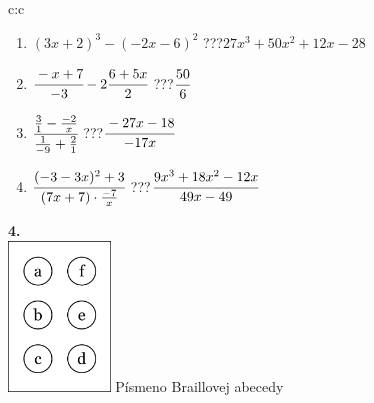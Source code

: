 \documentclass[10pt]{report}
\begin{document}
\begin{tabular}{c:c}
\begin{minipage}[c][104.5mm][t]{0.5\linewidth}
\begin{center}
\begin{minipage}{0.79\linewidth}
\begin{center}
\begin{varwidth}{\linewidth}
\begin{enumerate}
\item $(3x+2)^3-(-2x-6)^2$\quad \dotfill\; ???\;\dotfill \quad $27x^3+50x^2+12x-28$
\item $\cfrac{-x+7}{-3}-2\cfrac{6+5x}{2}$\quad \dotfill\; ???\;\dotfill \quad $\cfrac{50}{6}$
\item $\cfrac{\frac{3}{1}-\frac{-2}{x}}{\frac{1}{-9}+\frac{2}{1}}$\quad \dotfill\; ???\;\dotfill \quad $\cfrac{-27x-18}{-17x}$
\item $\cfrac{(-3-3x)^2+3}{(7x+7)\cdot\frac{-7}{x}}$\quad \dotfill\; ???\;\dotfill \quad $\cfrac{9x^3+18x^2-12x}{49x-49}$
\end{enumerate}
\end{varwidth}
\end{center}
\end{minipage}
\begin{minipage}{0.20\linewidth}
\begin{center}
{\Huge\bfseries 4.} \\[2mm]
\includegraphics[height=40mm]{../images/braille.png}
{\small Písmeno Braillovej abecedy}
\end{center}
\end{minipage}
\end{center}
\end{minipage}
%
\end{tabular}
\newpage
\thispagestyle{empty}
\end{document}
